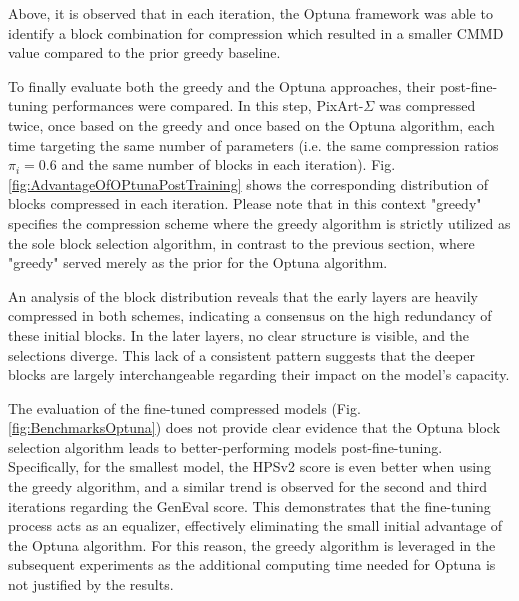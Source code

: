 Above, it is observed that in each iteration, the Optuna framework was able to identify a block combination for compression which resulted in a smaller \gls{CMMD} value compared to the prior greedy baseline.

To finally evaluate both the greedy and the Optuna approaches, their post-fine-tuning performances were compared. In this step, PixArt-$\Sigma$ was compressed twice, once based on the greedy and once based on the Optuna algorithm, each time targeting the same number of parameters (i.e. the same compression ratios $\pi_i = 0.6$ and the same number of blocks in each iteration). Fig. \ref{fig:AdvantageOfOPtunaPostTraining} shows the corresponding distribution of blocks compressed in each iteration. Please note that in this context "greedy" specifies the compression scheme where the greedy algorithm is strictly utilized as the sole block selection algorithm, in contrast to the previous section, where "greedy" served merely as the prior for the Optuna algorithm.

  An analysis of the block distribution reveals that the early layers are heavily compressed in both schemes, indicating a consensus on the high redundancy of these initial blocks. In the later layers, no clear structure is visible, and the selections diverge. This lack of a consistent pattern suggests that the deeper blocks are largely interchangeable regarding their impact on the model's capacity. 
  
 The evaluation of the fine-tuned compressed models (Fig. \ref{fig:BenchmarksOptuna}) does not provide clear evidence that the Optuna block selection algorithm leads to better-performing models post-fine-tuning. Specifically, for the smallest model, the HPSv2 score is even better when using the greedy algorithm, and a similar trend is observed for the second and third iterations regarding the GenEval score. This demonstrates that the fine-tuning process acts as an equalizer, effectively eliminating the small initial advantage of the Optuna algorithm. For this reason, the greedy algorithm is leveraged in the subsequent experiments as the additional computing time needed for Optuna is not justified by the results.







